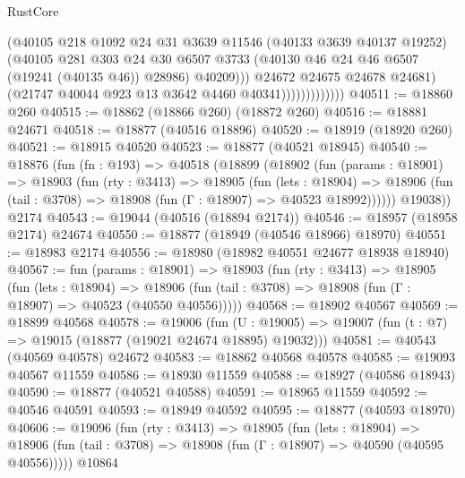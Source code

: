 \begin{lexlean}{RustCore}
\begin{coremodule}
                                (@40105
                                  @218
                                  @1092
                                  @24
                                  @31
                                  @3639
                                  @11546
                                  (@40133 @3639 @40137 @19252)
                                  (@40105
                                    @281
                                    @303
                                    @24
                                    @30
                                    @6507
                                    @3733
                                    (@40130 @46 @24 @46 @6507 (@19241 (@40135 @46)) @28986)
                                    @40209)))
                              @24672
                              @24675
                              @24678
                              @24681)
                            (@21747 @40044 @923 @13 @3642 @4460 @40341)))))))))))))
@40511 := @18860 @260
@40515 := @18862 (@18866 @260) (@18872 @260)
@40516 := @18881 @24671
@40518 := @18877 (@40516 @18896)
@40520 := @18919 (@18920 @260)
@40521 := @18915 @40520
@40523 := @18877 (@40521 @18945)
@40540 := @18876
    (fun (fn : @193) =>
    @40518
      (@18899
        (@18902
          (fun (params : @18901) =>
          @18903
            (fun (rty : @3413) =>
            @18905
              (fun (lets : @18904) =>
              @18906 (fun (tail : @3708) => @18908 (fun (Γ : @18907) => @40523 @18992))))))
        @19038))
    @2174
@40543 := @19044 (@40516 (@18894 @2174))
@40546 := @18957 (@18958 @2174) @24674
@40550 := @18877 (@18949 (@40546 @18966) @18970)
@40551 := @18983 @2174
@40556 := @18980 (@18982 @40551 @24677 @18938 @18940)
@40567 := fun (params : @18901) =>
  @18903
    (fun (rty : @3413) =>
    @18905
      (fun (lets : @18904) =>
      @18906 (fun (tail : @3708) => @18908 (fun (Γ : @18907) => @40523 (@40550 @40556)))))
@40568 := @18902 @40567
@40569 := @18899 @40568
@40578 := @19006
    (fun (U : @19005) => @19007 (fun (t : @7) => @19015 (@18877 (@19021 @24674 @18895) @19032)))
@40581 := @40543 (@40569 @40578) @24672
@40583 := @18862 @40568 @40578
@40585 := @19093 @40567 @11559
@40586 := @18930 @11559
@40588 := @18927 (@40586 @18943)
@40590 := @18877 (@40521 @40588)
@40591 := @18965 @11559
@40592 := @40546 @40591
@40593 := @18949 @40592
@40595 := @18877 (@40593 @18970)
@40606 := @19096
    (fun (rty : @3413) =>
    @18905
      (fun (lets : @18904) =>
      @18906 (fun (tail : @3708) => @18908 (fun (Γ : @18907) => @40590 (@40595 @40556)))))
    @10864

\end{coremodule}
\end{lexlean}
